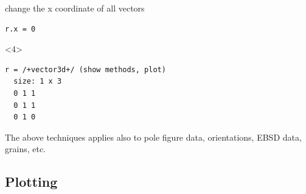 \documentclass[compress]{beamer}
\begin{document}
\begin{frame}[fragile]
\begin{overlayarea}{\textwidth}{8cm}
  \pause \medskip

  change the x coordinate of all vectors
    \begin{lstlisting}[style=input]
r.x = 0
    \end{lstlisting}
        \begin{onlyenv}<4>
          \vspace{-0.3cm}
      \begin{lstlisting}[style=output]
r = /+vector3d+/ (show methods, plot)
  size: 1 x 3
  0 1 1
  0 1 1
  0 1 0
     \end{lstlisting}
    \end{onlyenv}

    \pause \medskip

    \alert{The above techniques applies also to pole figure data,
    orientations, EBSD data, grains, etc.}
  \end{overlayarea}


\end{frame}


\subsection*{Plotting}
\label{sec:plotting}
\end{document}
